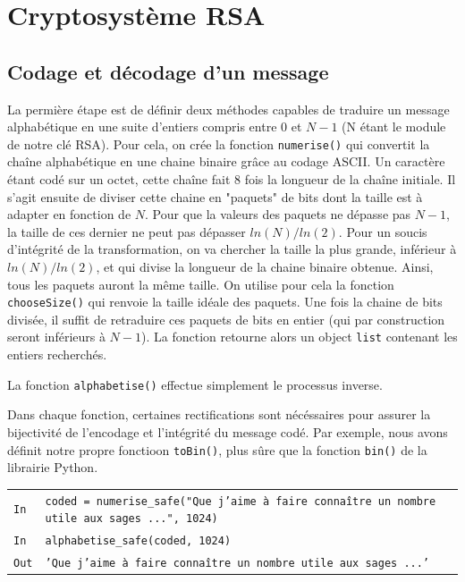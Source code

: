 \documentclass[titlepage]{article}
\begin{document}
    \section{Cryptosystème RSA}
    \subsection{Codage et décodage d'un message}
    La permière étape est de définir deux méthodes capables de traduire un message alphabétique en une suite d'entiers compris entre $0$ et $N-1$ (N étant le module de notre clé RSA).
    Pour cela, on crée la fonction \texttt{numerise()} qui convertit la chaîne alphabétique en une chaine binaire grâce au codage ASCII. Un caractère étant codé sur un octet, cette chaîne fait 8 fois la longueur de la chaîne initiale.
    Il s'agit ensuite de diviser cette chaine en "paquets" de bits dont la taille est à adapter en fonction de $N$.
    Pour que la valeurs des paquets ne dépasse pas $N-1$, la taille de ces dernier ne peut pas dépasser $ln(N)/ln(2)$. Pour un soucis d'intégrité de la transformation, on va chercher la taille la plus grande, inférieur à $ln(N)/ln(2)$, et qui divise la longueur de la chaine binaire obtenue.
    Ainsi, tous les paquets auront la même taille. On utilise pour cela la fonction \texttt{chooseSize()} qui renvoie la taille idéale des paquets.
    Une fois la chaine de bits divisée, il suffit de retraduire ces paquets de bits en entier (qui par construction seront inférieurs à $N-1$).
    La fonction retourne alors un object \texttt{list} contenant les entiers recherchés.

    

    La fonction \texttt{alphabetise()} effectue simplement le processus inverse.
    
    

    Dans chaque fonction, certaines rectifications sont nécéssaires pour assurer la bijectivité de l'encodage et l'intégrité du message codé. Par exemple, nous avons définit notre propre fonctioon \texttt{toBin()}, plus sûre que la fonction \texttt{bin()} de la librairie Python. 

    \begin{tabularx}{12cm}{|p{0.60cm}|X|}
        \hline
        \rowcolor{gray} \texttt{In} & \texttt{coded = numerise\_safe("Que j’aime à faire connaître un nombre utile aux sages ...", 1024)} \\
        \rowcolor{gray} \texttt{In} & \texttt{alphabetise\_safe(coded, 1024)} \\
        \hline
        \texttt{Out} & \texttt{'Que j’aime à faire connaître un nombre utile aux sages ...'} \\
        \hline
    \end{tabularx}
    \bigbreak
\end{document}

